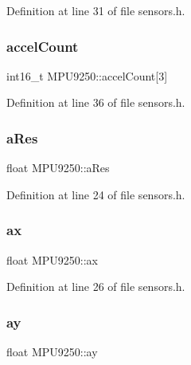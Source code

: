 Definition at line 31 of file sensors.\+h.

\mbox{\label{classMPU9250_adb56df6ceaf1dc204f97270540ac8b14}} 
\subsubsection{\texorpdfstring{accel\+Count}{accelCount}}
{\footnotesize\ttfamily int16\+\_\+t M\+P\+U9250\+::accel\+Count\mbox{[}3\mbox{]}}



Definition at line 36 of file sensors.\+h.

\mbox{\label{classMPU9250_afa89af2772cead0f76a4ddd92ec5f6a8}} 
\subsubsection{\texorpdfstring{a\+Res}{aRes}}
{\footnotesize\ttfamily float M\+P\+U9250\+::a\+Res}



Definition at line 24 of file sensors.\+h.

\mbox{\label{classMPU9250_aea8a7622821bf8aca55fcef71d91e29f}} 
\subsubsection{\texorpdfstring{ax}{ax}}
{\footnotesize\ttfamily float M\+P\+U9250\+::ax}



Definition at line 26 of file sensors.\+h.

\mbox{\label{classMPU9250_a5129e95dbe12544fa34cc53b5644ff71}} 
\subsubsection{\texorpdfstring{ay}{ay}}
{\footnotesize\ttfamily float M\+P\+U9250\+::ay}



